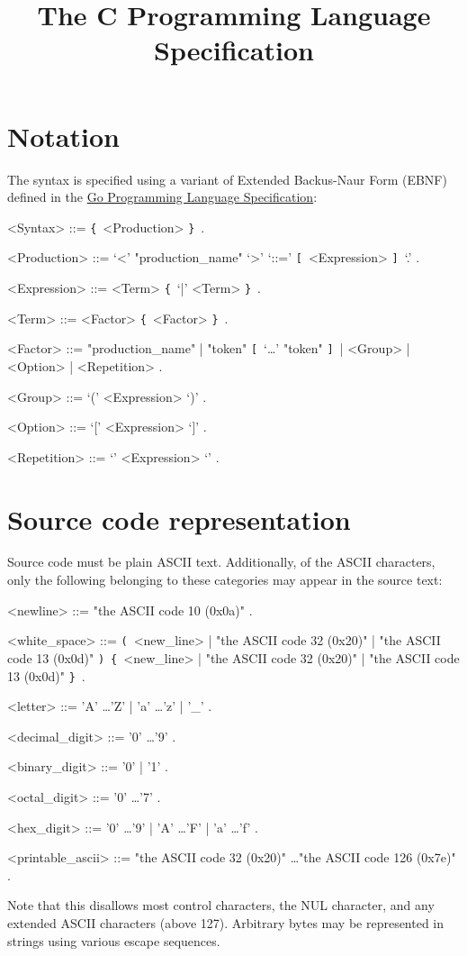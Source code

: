 \documentclass{article}
\title{The C Programming Language Specification}
\def\lrep{\synshortsoff\texttt{\{}\synshorts~}
\def\rrep{\synshortsoff\texttt{\}}\synshorts~}
\def\lopt{\synshortsoff\texttt{[}\synshorts~}
\def\ropt{\synshortsoff\texttt{]}\synshorts~}
\def\lgrp{\synshortsoff\texttt{(}\synshorts~}
\def\rgrp{\synshortsoff\texttt{)}\synshorts~}
\begin{document}
\maketitle

\section*{Notation}
The syntax is specified using a variant of Extended Backus-Naur Form (EBNF) defined in the \href{https://go.dev/ref/spec#Notation}{Go Programming Language Specification}:
\begin{grammar}
  <Syntax> ::= \lrep <Production> \rrep .
  
  <Production> ::= `<' "production_name" `>' `::=' \lopt <Expression> \ropt `.' .
  
  <Expression> ::= <Term> \lrep `|' <Term> \rrep .
  
  <Term> ::= <Factor> \lrep <Factor> \rrep .
  
  <Factor> ::= "production_name" | "token" \lopt `\ldots' "token" \ropt | <Group> | <Option> | <Repetition> .
  
  <Group> ::= `(' <Expression> `)' .
  
  <Option> ::= `[' <Expression> `]' .
  
  <Repetition> ::= `{' <Expression> `}' .

\end{grammar}
\section*{Source code representation}
Source code must be plain ASCII text. Additionally, of the ASCII
characters, only the following belonging to these categories may
appear in the source text:
\begin{grammar}
  <newline> ::= "the ASCII code 10 (0x0a)" .

  <white_space> ::= \lgrp <new_line> | "the ASCII code 32 (0x20)" | "the ASCII code 13 (0x0d)" \rgrp \lrep <new_line> | "the ASCII code 32 (0x20)" | "the ASCII code 13 (0x0d)" \rrep .

  <letter> ::= 'A' \ldots 'Z' | 'a' \ldots 'z' | '_' .

  <decimal_digit> ::= '0' \ldots '9' .

  <binary_digit> ::= '0' | '1' .

  <octal_digit> ::= '0' \ldots '7' .

  <hex_digit> ::= '0' \ldots '9' | 'A' \ldots 'F' | 'a' \ldots 'f' .

  <printable_ascii> ::= "the ASCII code 32 (0x20)" \ldots "the ASCII code 126 (0x7e)" .
  
\end{grammar}
Note that this disallows most control characters, the NUL character,
and any extended ASCII characters (above 127). Arbitrary bytes may be
represented in strings using various escape sequences. %
\end{document}

